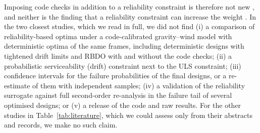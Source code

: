 Imposing code checks in addition to a reliability constraint is therefore not new
\citep{Papadrakakis2004,TruongKim2017}, and neither is the finding that a reliability constraint can
increase the weight \citep{Papadrakakis2004}. In the two closest studies, which we read in full, we did
not find (i) a comparison of reliability-based optima under a code-calibrated gravity--wind model with
deterministic optima of the same frames, including deterministic designs with tightened drift limits
and RBDO with and without the code checks; (ii) a probabilistic serviceability (drift) constraint
next to the ULS constraint; (iii) confidence intervals for the failure probabilities of the final
designs, or a re-estimate of them with independent samples; (iv) a validation of the reliability
surrogate against full second-order re-analysis in the failure tail of several optimised designs; or
(v) a release of the code and raw results. For the other studies in Table~\ref{tab:literature},
which we could assess only from their abstracts and records, we make no such claim.

